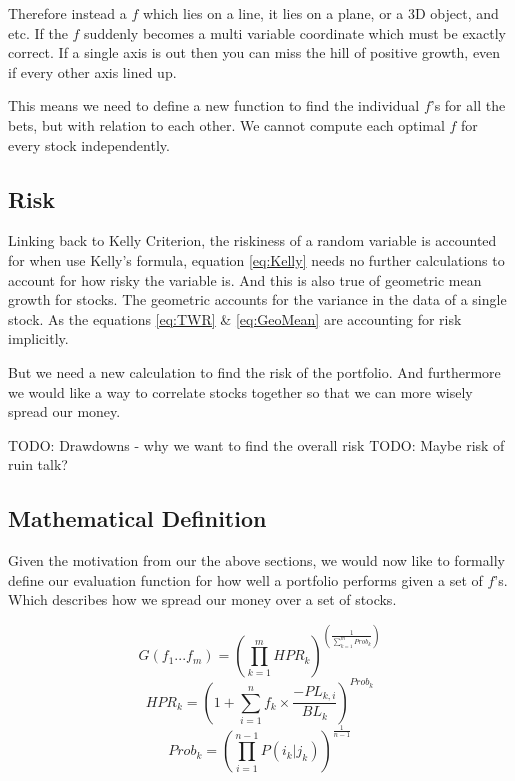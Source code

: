 \documentclass[11pt]{article}
\begin{document}
    Therefore instead a \(f\) which lies on a line, it lies on a plane, or a 3D object, 
    and etc. If the \(f\) suddenly becomes a multi variable coordinate which must be 
    exactly correct. If a single axis is out then you can miss the hill of positive 
    growth, even if every other axis lined up.

    This means we need to define a new function to find the individual \(f\)'s for all the bets,
    but with relation to each other. We cannot compute each optimal \(f\) for every stock
    independently.


\subsection{Risk}

    Linking back to Kelly Criterion, the riskiness of a random variable is accounted for
    when use Kelly's formula, equation \ref{eq:Kelly} needs no further calculations
    to account for how risky the variable is. And this is also true of geometric mean growth
    for stocks. The geometric accounts for the variance in the data of a single stock. As the
    equations \ref{eq:TWR} \& \ref{eq:GeoMean} are accounting for risk implicitly.

    But we need a new calculation to find the risk of the portfolio. And furthermore we would
    like a way to correlate stocks together so that we can more wisely spread our money.

    TODO: Drawdowns - why we want to find the overall risk
    TODO: Maybe risk of ruin talk?


\subsection{Mathematical Definition}

    Given the motivation from our the above sections, we would now like to formally define our
    evaluation function for how well a portfolio performs given a set of \(f\)'s. Which describes
    how we spread our money over a set of stocks.

    \begin{equation}\label{eq:G}
        G(f_1...f_m) = \left( \displaystyle\prod^{m}_{k=1} HPR_k \right) ^{ \left( \displaystyle\frac{1}{\sum^{m}_{k=1}Prob_k} \right)}
    \end{equation}
    \begin{equation}\label{eq:HPR_k}
        HPR_k = \left( 1 +  \displaystyle\sum^{n}_{i=1} f_k \times \frac{- PL_{k,i}}{BL_k} \right) ^{Prob_k}
    \end{equation}
    \begin{equation}\label{eq:Prob_k}
        Prob_k = \left( \displaystyle\prod^{n - 1}_{i=1} P(i_k | j_k)\right)^{\frac{1}{n - 1}}
    \end{equation}
\end{document}
